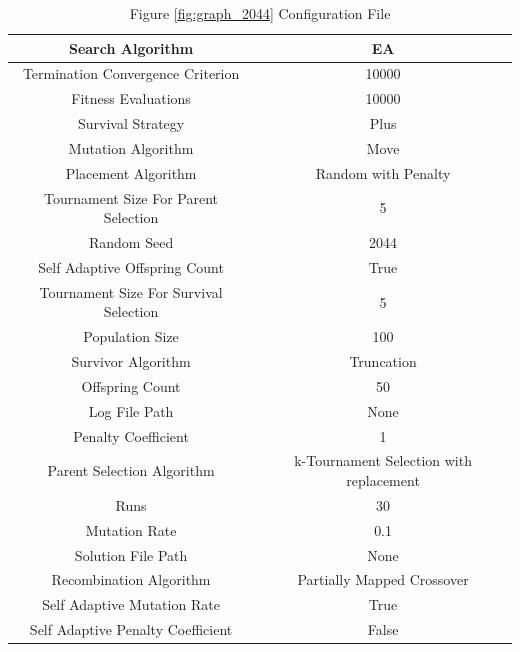 \documentclass{standalone}
\begin{document}
\begin{table}[!htb]
	\centering
	\caption{Figure \ref{fig:graph_2044} Configuration File}
	\label{tab:graph_2044}
	\begin{tabular}{| c | c |}
		\hline
		Search Algorithm		& EA		 \\
		\hline
		Termination Convergence Criterion		& 10000		 \\
		\hline
		Fitness Evaluations		& 10000		 \\
		\hline
		Survival Strategy		& Plus		 \\
		\hline
		Mutation Algorithm		& Move		 \\
		\hline
		Placement Algorithm		& Random with Penalty		 \\
		\hline
		Tournament Size For Parent Selection		& 5		 \\
		\hline
		Random Seed		& 2044		 \\
		\hline
		Self Adaptive Offspring Count		& True		 \\
		\hline
		Tournament Size For Survival Selection		& 5		 \\
		\hline
		Population Size		& 100		 \\
		\hline
		Survivor Algorithm		& Truncation		 \\
		\hline
		Offspring Count		& 50		 \\
		\hline
		Log File Path		& None		 \\
		\hline
		Penalty Coefficient		& 1		 \\
		\hline
		Parent Selection Algorithm		& k-Tournament Selection with replacement		 \\
		\hline
		Runs		& 30		 \\
		\hline
		Mutation Rate		& 0.1		 \\
		\hline
		Solution File Path		& None		 \\
		\hline
		Recombination Algorithm		& Partially Mapped Crossover		 \\
		\hline
		Self Adaptive Mutation Rate		& True		 \\
		\hline
		Self Adaptive Penalty Coefficient		& False		 \\
		\hline
	\end{tabular}
\end{table}
\end{document}

